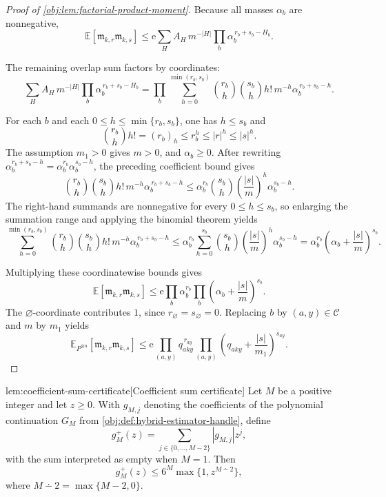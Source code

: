 \documentclass[11pt]{article}
\begin{document}
\begin{proof}[Proof of \cref{obj:lem:factorial-product-moment}]
Because all masses \(\alpha_b\) are nonnegative,
\[
\mathbb E\!\left[
\mathfrak m_{k,r}\mathfrak m_{k,s}
\right]
\le
\mathrm e
\sum_H
A_H\,m^{-|H|}
\prod_b \alpha_b^{\,r_b+s_b-H_b}.
\]

The remaining overlap sum factors by coordinates:
\[
\sum_H
A_H\,m^{-|H|}
\prod_b \alpha_b^{\,r_b+s_b-H_b}
=
\prod_b
\sum_{h=0}^{\min(r_b,s_b)}
{r_b\choose h}{s_b\choose h}h!\,m^{-h}
\alpha_b^{\,r_b+s_b-h}.
\]

For each \(b\) and each \(0\le h\le\min\{r_b,s_b\}\), one has \(h\le s_b\) and
\[
{r_b\choose h}h!=(r_b)_h\le r_b^h\le |r|^h\le |s|^h .
\]
The assumption \(m_1>0\) gives \(m>0\), and \(\alpha_b\ge0\).  After rewriting
\(\alpha_b^{r_b+s_b-h}=\alpha_b^{r_b}\alpha_b^{s_b-h}\), the preceding coefficient bound gives
\[
{r_b\choose h}{s_b\choose h}h!\,m^{-h}
\alpha_b^{\,r_b+s_b-h}
\le
\alpha_b^{r_b}{s_b\choose h}
\left(\frac{|s|}{m}\right)^h
\alpha_b^{s_b-h}.
\]
The right-hand summands are nonnegative for every \(0\le h\le s_b\), so enlarging the summation range and applying the binomial theorem yields
\[
\sum_{h=0}^{\min(r_b,s_b)}
{r_b\choose h}{s_b\choose h}h!\,m^{-h}
\alpha_b^{\,r_b+s_b-h}
\le
\alpha_b^{r_b}
\sum_{h=0}^{s_b}{s_b\choose h}
\left(\frac{|s|}{m}\right)^h
\alpha_b^{s_b-h}
=
\alpha_b^{r_b}
\left(\alpha_b+\frac{|s|}{m}\right)^{s_b}.
\]

Multiplying these coordinatewise bounds gives
\[
\mathbb E\!\left[
\mathfrak m_{k,r}\mathfrak m_{k,s}
\right]
\le
\mathrm e
\prod_{b}\alpha_b^{r_b}
\prod_b\left(\alpha_b+\frac{|s|}{m}\right)^{s_b}.
\]
The \(\varnothing\)-coordinate contributes \(1\), since \(r_{\varnothing}=s_{\varnothing}=0\).  Replacing \(b\) by \((a,y)\in\mathcal C\) and \(m\) by \(m_1\) yields
\[
\mathbb E_{P^{\otimes n}}\!\left[\mathfrak m_{k,r}\mathfrak m_{k,s}\right]
\le
\mathrm e
\prod_{(a,y)}q_{aky}^{\,r_{ay}}
\prod_{(a,y)}
\left(q_{aky}+\frac{|s|}{m_1}\right)^{s_{ay}} .
\]
\end{proof}

\begin{lemmav}{lem:coefficient-sum-certificate}[Coefficient sum certificate]
Let \(M\) be a positive integer and let \(z\ge 0\). With \(g_{M,j}\) denoting the coefficients of the polynomial continuation \(G_M\) from \cref{obj:def:hybrid-estimator-handle}, define
\[
g_M^+(z)
=
\sum_{j\in\{0,\ldots,M-2\}} |g_{M,j}| z^j,
\]
with the sum interpreted as empty when \(M=1\). Then
\[
g_M^+(z)
\le
6^M \max\{1,z^{M\dotminus 2}\},
\]
where \(M\dotminus 2=\max\{M-2,0\}\).
\end{lemmav}
\end{document}
